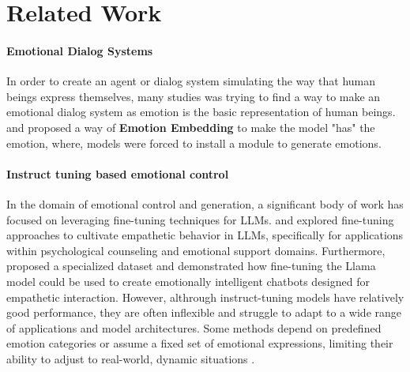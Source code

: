 \section{Related Work}
\paragraph{Emotional Dialog Systems} In order to create an agent or dialog system simulating the way that human beings express themselves, many studies was trying to find a way to make an emotional dialog system as emotion is the basic representation of human beings. \citet{zhou2018emotional} and \citet{2019Generating} proposed a way of \textbf{Emotion Embedding} to make the model "has" the emotion, where, models were forced to install a module to generate emotions. %

\paragraph{Instruct tuning based emotional control} In the domain of emotional control and generation, a significant body of work has focused on leveraging fine-tuning techniques for LLMs. \citet{chen2023soulchat} and \citet{chen2024cause} explored fine-tuning approaches to cultivate empathetic behavior in LLMs, specifically for applications within psychological counseling and emotional support domains. Furthermore, \citet{zheng2023buildingemotionalsupportchatbots} proposed a specialized dataset and demonstrated how fine-tuning the Llama model could be used to create emotionally intelligent chatbots designed for empathetic interaction. However, althrough instruct-tuning models have relatively good performance, they are often inflexible and struggle to adapt to a wide range of applications and model architectures\cite{ghosh2024closer}. Some methods depend on predefined emotion categories or assume a fixed set of emotional expressions, limiting their ability to adjust to real-world, dynamic situations \cite{liu2024emollms}.


